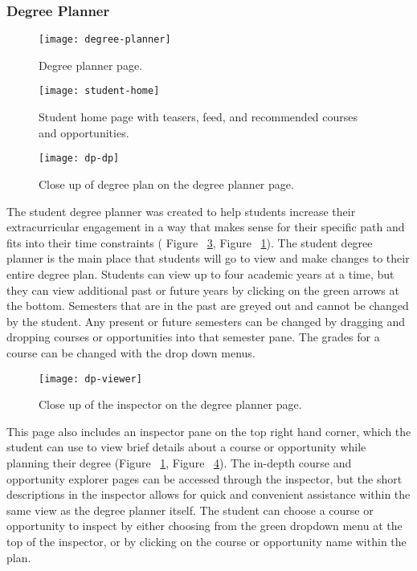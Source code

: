 \subsubsection{Degree Planner}
\begin{figure}[htbp!]
\centering
\texttt{[image: degree-planner]}
\caption{Degree planner page.}
\label{degree-planner-page}
\end{figure}

\begin{figure}[htbp!]
\centering
\texttt{[image: student-home]}
\caption{Student home page with teasers, feed, and recommended courses and opportunities.}
\label{student-home-page}
\end{figure}

\begin{figure}[htbp!]
\centering
\texttt{[image: dp-dp]}
\caption{Close up of degree plan on the degree planner page.}
\label{degree-planner}
\end{figure}

The student degree planner was created to help students increase their extracurricular engagement in a way that makes sense for their specific path and fits into their time constraints ( Figure ~\ref{degree-planner}, Figure ~\ref{degree-planner-page}). The student degree planner is the main place that students will go to view and make changes to their entire degree plan. Students can view up to four academic years at a time, but they can view additional past or future years by clicking on the green arrows at the bottom. Semesters that are in the past are greyed out and cannot be changed by the student. Any present or future semesters can be changed by dragging and dropping courses or opportunities into that semester pane. The grades for a course can be changed with the drop down menus. 

\begin{figure}[htbp!]
\centering
\texttt{[image: dp-viewer]}
\caption{Close up of the inspector on the degree planner page.}
\label{inspector}
\end{figure}

This page also includes an inspector pane on the top right hand corner, which the student can use to view brief details about a course or opportunity while planning their degree (Figure ~\ref{degree-planner-page}, Figure ~\ref{inspector}). The in-depth course and opportunity explorer pages can be accessed through the inspector, but the short descriptions in the inspector allows for quick and convenient assistance within the same view as the degree planner itself. The student can choose a course or opportunity to inspect by either choosing from the green dropdown menu at the top of the inspector, or by clicking on the course or opportunity name within the plan. 

